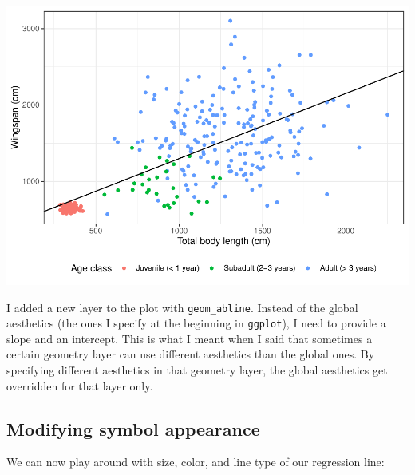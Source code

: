 \documentclass[
]{book}
\begin{document}
\includegraphics{reproducible-science_files/figure-latex/gg17-1.pdf}

I added a new layer to the plot with \texttt{geom\_abline}. Instead of the global
aesthetics (the ones I specify at the beginning in \texttt{ggplot}), I need to provide
a slope and an intercept. This is what I meant when I said that sometimes a
certain geometry layer can use different aesthetics than the global ones.
By specifying different aesthetics in that geometry layer, the global aesthetics
get overridden for that layer only.

\hypertarget{modifying-symbol-appearance}{%
\subsection{Modifying symbol appearance}\label{modifying-symbol-appearance}}

We can now play around with size, color, and line type of our regression line:
\end{document}
